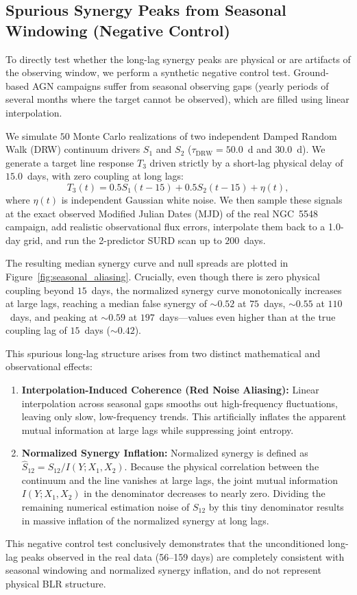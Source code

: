 \documentclass[fleqn,usenatbib]{mnras}
\begin{document}
\subsection{Spurious Synergy Peaks from Seasonal Windowing (Negative Control)}
\label{sec:seasonal_aliasing_test}

To directly test whether the long-lag synergy peaks are physical or are artifacts of the observing window, we perform a synthetic negative control test. Ground-based AGN campaigns suffer from seasonal observing gaps (yearly periods of several months where the target cannot be observed), which are filled using linear interpolation.

We simulate $50$ Monte Carlo realizations of two independent Damped Random Walk (DRW) continuum drivers $S_1$ and $S_2$ ($\tau_{\mathrm{DRW}} = 50.0$~d and $30.0$~d). We generate a target line response $T_3$ driven strictly by a short-lag physical delay of $15.0$~days, with zero coupling at long lags:
\begin{equation}
T_3(t) = 0.5 S_1(t-15) + 0.5 S_2(t-15) + \eta(t),
\end{equation}
where $\eta(t)$ is independent Gaussian white noise. We then sample these signals at the exact observed Modified Julian Dates (MJD) of the real NGC~5548 campaign, add realistic observational flux errors, interpolate them back to a 1.0-day grid, and run the 2-predictor SURD scan up to $200$~days.

The resulting median synergy curve and null spreads are plotted in Figure~\ref{fig:seasonal_aliasing}. Crucially, even though there is zero physical coupling beyond $15$~days, the normalized synergy curve monotonically increases at large lags, reaching a median false synergy of $\sim 0.52$ at $75$~days, $\sim 0.55$ at $110$~days, and peaking at $\sim 0.59$ at $197$~days---values even higher than at the true coupling lag of $15$~days ($\sim 0.42$).

This spurious long-lag structure arises from two distinct mathematical and observational effects:
\begin{enumerate}
    \item \textbf{Interpolation-Induced Coherence (Red Noise Aliasing):} Linear interpolation across seasonal gaps smooths out high-frequency fluctuations, leaving only slow, low-frequency trends. This artificially inflates the apparent mutual information at large lags while suppressing joint entropy.
    \item \textbf{Normalized Synergy Inflation:} Normalized synergy is defined as $\widehat{S}_{12} = S_{12} / I(Y; X_1, X_2)$. Because the physical correlation between the continuum and the line vanishes at large lags, the joint mutual information $I(Y; X_1, X_2)$ in the denominator decreases to nearly zero. Dividing the remaining numerical estimation noise of $S_{12}$ by this tiny denominator results in massive inflation of the normalized synergy at long lags.
\end{enumerate}
This negative control test conclusively demonstrates that the unconditioned long-lag peaks observed in the real data (56--159 days) are completely consistent with seasonal windowing and normalized synergy inflation, and do not represent physical BLR structure.
\end{document}
